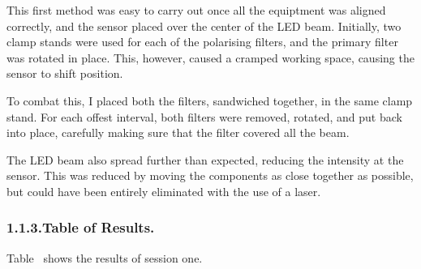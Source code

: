 \documentclass{article}
\begin{document}
\noindent{}This first method was easy to carry out once all the equiptment was aligned correctly, and the sensor placed over the center of the LED beam. Initially, two clamp stands were used for each of the polarising filters, and the primary filter was rotated in place. This, however, caused a cramped working space, causing the sensor to shift position.%

To combat this, I placed both the filters, sandwiched together, in the same clamp stand. For each offest interval, both filters were removed, rotated, and put back into place, carefully making sure that the filter covered all the beam.%

The LED beam also spread further than expected, reducing the intensity at the sensor. This was reduced by moving the components as close together as possible, but could have been entirely eliminated with the use of a laser.%

\subsubsection{1.1.3.\hspace*{0.5em}Table of Results.}\label{sec-table-of-results}%

\noindent{}Table~ shows the results of session one.%
\end{document}
